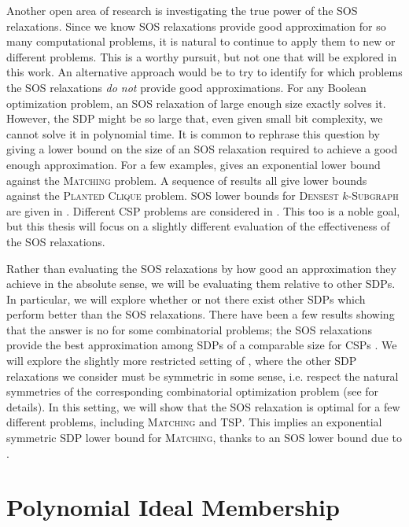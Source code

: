Another open area of research is investigating the true power of the SOS relaxations.
Since we know SOS relaxations provide good approximation for so many computational problems, it is natural to continue to apply them to new or different problems.
This is a worthy pursuit, but not one that will be explored in this work.
An alternative approach would be to try to identify for which problems the SOS relaxations \emph{do not} provide good approximations.
For any Boolean optimization problem, an SOS relaxation of large enough size exactly solves it.
However, the SDP might be so large that, even given small bit complexity, we cannot solve it in polynomial time.
It is common to rephrase this question by giving a lower bound on the size of an SOS relaxation required to achieve a good enough approximation.
For a few examples, \cite{Gri01} gives an exponential lower bound against the \textsc{Matching} problem. A sequence of results \cite{MPW15, DM15, RS15, HKP15,BHKKMP16} all give lower bounds against the \textsc{Planted Clique} problem. SOS lower bounds for \textsc{Densest $k$-Subgraph} are given in \cite{BCVGZ12}. Different \textsc{CSP} problems are considered in \cite{Sch08,GMT09,Tul09,LRS15}.
This too is a noble goal, but this thesis will focus on a slightly different evaluation of the effectiveness of the SOS relaxations.

Rather than evaluating the SOS relaxations by how good an approximation they achieve in the absolute sense, we will be evaluating them relative to other SDPs.
In particular, we will explore whether or not there exist other SDPs which perform better than the SOS relaxations.
There have been a few results showing that the answer is no for some combinatorial problems; the SOS relaxations provide the best approximation among SDPs of a comparable size for CSPs \cite{LRST14,LRS15}. We will explore the slightly more restricted setting of \cite{LRST14}, where the other SDP relaxations we consider must be symmetric in some sense, i.e. respect the natural symmetries of the corresponding combinatorial optimization problem (see  for details). In this setting, we will show that the SOS relaxation is optimal for a few different problems, including \textsc{Matching} and \textsc{TSP}. This implies an exponential symmetric SDP lower bound for \textsc{Matching}, thanks to an SOS lower bound due to \cite{Gri01}.

\section{Polynomial Ideal Membership}

